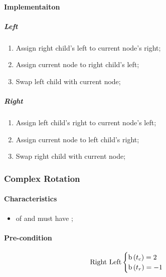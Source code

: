     \paragraph{Implementaiton}
    
    \subparagraph{Left}
    \begin{enumerate}
      \item Assign right child's left to current node's right;
      \item Assign current node to right child's left;
      \item Swap left child with current node;
    \end{enumerate}
    
    \subparagraph{Right}
    \begin{enumerate}
      \item Assign left child's right to current node's left;
      \item Assign current node to left child's right;
      \item Swap right child with current node;
    \end{enumerate}
  
  \subsubsection{Complex Rotation}
  
    \paragraph{Characteristics}
    \begin{itemize}
      \item {} of  and  must have ;
    \end{itemize}
  
    \paragraph{Pre-condition}
  
    \begin{equation}
      \text{Right Left}
      \begin{cases}
        \operatorname{b} \left( t_{c} \right) = 2 \\ 
        \operatorname{b} \left( t_{r} \right) = -1 
      \end{cases}
    \end{equation}
    
